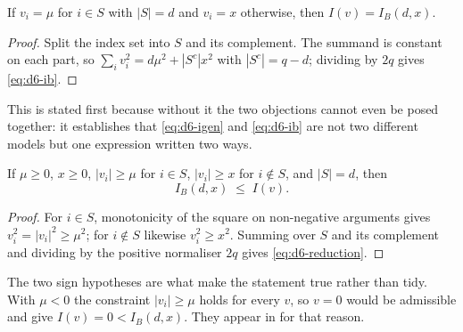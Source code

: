\begin{theorem}
\label{thm:d6-slice}
If $v_{i}=\mu$ for $i\in S$ with $|S|=d$ and $v_{i}=x$ otherwise, then $I(v)=I_{B}(d,x)$.
\end{theorem}

\begin{proof}
Split the index set into $S$ and its complement. The summand is constant on each part, so
$\sum_{i}v_{i}^{2}=d\mu^{2}+|S^{c}|x^{2}$ with $|S^{c}|=q-d$; dividing by $2q$ gives
\eqref{eq:d6-ib}.
\end{proof}


This is stated first because without it the two objections cannot even be posed together: it
establishes that \eqref{eq:d6-igen} and \eqref{eq:d6-ib} are not two different models but one
expression written two ways.

\begin{theorem}
\label{thm:d6-reduction}
If $\mu\ge0$, $x\ge0$, $|v_{i}|\ge\mu$ for $i\in S$, $|v_{i}|\ge x$ for $i\notin S$, and
$|S|=d$, then
\begin{equation}
I_{B}(d,x)\;\leq\;I(v).
\label{eq:d6-reduction}
\end{equation}
\end{theorem}

\begin{proof}
For $i\in S$, monotonicity of the square on non-negative arguments gives
$v_{i}^{2}=|v_{i}|^{2}\ge\mu^{2}$; for $i\notin S$ likewise $v_{i}^{2}\ge x^{2}$. Summing over
$S$ and its complement and dividing by the positive normaliser $2q$ gives
\eqref{eq:d6-reduction}.
\end{proof}


The two sign hypotheses are what make the statement true rather than tidy. With $\mu<0$ the
constraint $|v_{i}|\ge\mu$ holds for every $v$, so $v=0$ would be admissible and give
$I(v)=0<I_{B}(d,x)$. They appear in  for that reason.

